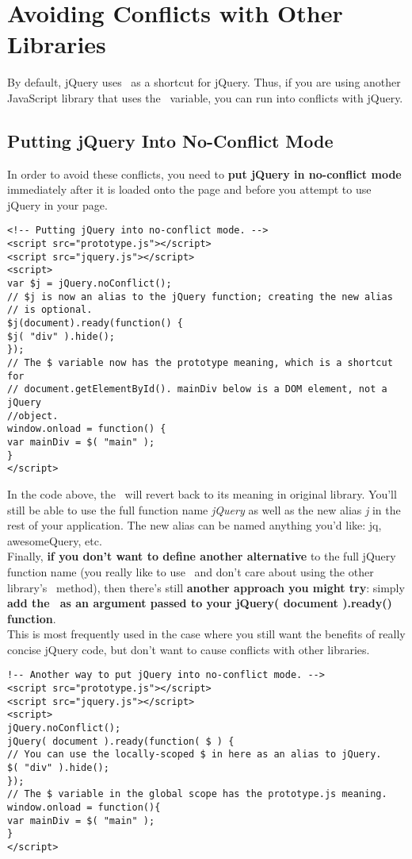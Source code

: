 \documentclass[10pt,letterpaper]{book}
\begin{document}
\section{Avoiding Conflicts with Other Libraries}
By default, jQuery uses \textdollar \, as a shortcut for jQuery. Thus, if you are using another JavaScript library that uses the \textdollar \, variable, you can run into conflicts with jQuery.\\
\subsection{Putting jQuery Into No-Conflict Mode}
In order to avoid these conflicts, you need to \textbf{put jQuery in no-conflict mode} immediately after it is loaded onto the page and before you attempt to use jQuery in your page.

\begin{lstlisting}
<!-- Putting jQuery into no-conflict mode. -->
<script src="prototype.js"></script>
<script src="jquery.js"></script>
<script>
var $j = jQuery.noConflict();
// $j is now an alias to the jQuery function; creating the new alias
// is optional.
$j(document).ready(function() {
$j( "div" ).hide();
});
// The $ variable now has the prototype meaning, which is a shortcut for
// document.getElementById(). mainDiv below is a DOM element, not a jQuery
//object.
window.onload = function() {
var mainDiv = $( "main" );
}
</script>
\end{lstlisting}
In the code above, the \textdollar \, will revert back to its meaning in original library. You'll still be able to use the full function name \textit{jQuery} as well as the new alias \textit{\textdollar j} in the rest of your application. The new alias can be named anything you'd like: jq, awesomeQuery, etc.\\
Finally, \textbf{if you don't want to define another alternative} to the full jQuery function name (you really like to use \textdollar \, and don't care about using the other library's \textdollar \, method), then there's still \textbf{another approach you might try}: simply \textbf{add the \textdollar \, as an argument passed to your jQuery( document ).ready() function}.\\
This is most frequently used in the case where you still want the benefits of really concise jQuery code, but don't want to cause conflicts with other libraries.

\begin{lstlisting}
!-- Another way to put jQuery into no-conflict mode. -->
<script src="prototype.js"></script>
<script src="jquery.js"></script>
<script>
jQuery.noConflict();
jQuery( document ).ready(function( $ ) {
// You can use the locally-scoped $ in here as an alias to jQuery.
$( "div" ).hide();
});
// The $ variable in the global scope has the prototype.js meaning.
window.onload = function(){
var mainDiv = $( "main" );
}
</script>
\end{lstlisting}
\end{document}
